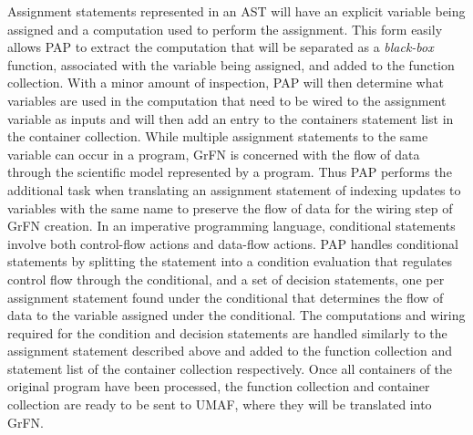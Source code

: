 Assignment statements represented in an AST will have an explicit variable being assigned and a computation used to perform the assignment.
This form easily allows PAP to extract the computation that will be separated as a \textit{black-box} function, associated with the variable being assigned, and added to the function collection.
With a minor amount of inspection, PAP will then determine what variables are used in the computation that need to be wired to the assignment variable as inputs and will then add an entry to the containers statement list in the container collection.
While multiple assignment statements to the same variable can occur in a program, GrFN is concerned with the flow of data through the scientific model represented by a program.
Thus PAP performs the additional task when translating an assignment statement of indexing updates to variables with the same name to preserve the flow of data for the wiring step of GrFN creation.
In an imperative programming language, conditional statements involve both control-flow actions and data-flow actions.
PAP handles conditional statements by splitting the statement into a condition evaluation that regulates control flow through the conditional, and a set of decision statements, one per assignment statement found under the conditional that determines the flow of data to the variable assigned under the conditional.
The computations and wiring required for the condition and decision statements are handled similarly to the assignment statement described above and added to the function collection and statement list of the container collection respectively.
Once all containers of the original program have been processed, the function collection and container collection are ready to be sent to UMAF, where they will be translated into GrFN.

